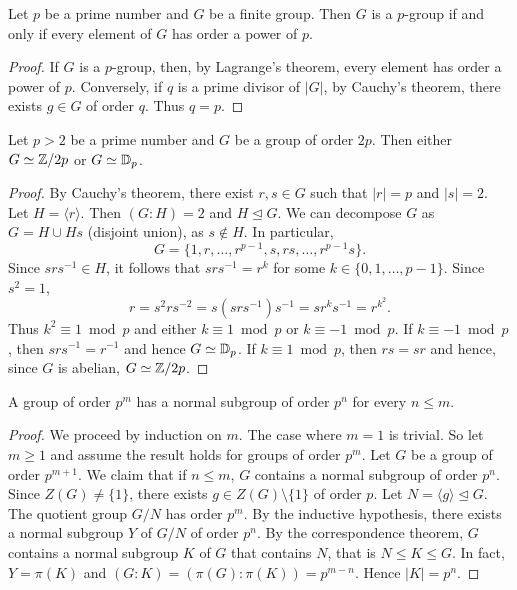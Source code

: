 \begin{corollary}
    Let $p$ be a prime number and $G$ be a finite group. 
    Then $G$ is a $p$-group if and only if 
    every element of $G$ has order a power of $p$. 
\end{corollary}

\begin{proof}
    If $G$ is a $p$-group, then, by Lagrange's theorem, 
    every element has order a power of $p$. Conversely, 
    if $q$ is a prime divisor of $|G|$, by 
    Cauchy's theorem, there exists $g\in G$ of order $q$. Thus $q=p$.
\end{proof}

\begin{corollary}
    Let $p>2$ be a prime number 
    and $G$ be a group of order $2p$. 
    Then either $G\simeq\mathbb{Z}/2p$ or $G\simeq\mathbb{D}_p$.
\end{corollary}

\begin{proof}
    By Cauchy's theorem, there exist $r,s\in G$ such that
    $|r|=p$ and $|s|=2$. Let $H=\langle r\rangle$. Then
    $(G:H)=2$ and $H\unlhd G$. We can decompose $G$ as 
    $G=H\cup Hs$ (disjoint union), 
    as $s\not\in H$. In particular, 
\[
G=\{1,r,\dots,r^{p-1},s,rs,\dots,r^{p-1}s\}.
\]
Since $srs^{-1}\in H$, it follows that $srs^{-1}=r^k$ for some
$k\in\{0,1,\dots,p-1\}$. Since $s^2=1$,
\[
r=s^2rs^{-2}=s(srs^{-1})s^{-1}=sr^ks^{-1}=r^{k^2}.
\]
Thus $k^2\equiv 1\bmod p$ and either 
$k\equiv 1\bmod p$ or $k\equiv-1\bmod p$. 
If $k\equiv -1\bmod p$, then $srs^{-1}=r^{-1}$ and hence $G\simeq\mathbb{D}_p$.
If $k\equiv 1\bmod p$, then $rs=sr$ and hence, since $G$ is abelian, $G\simeq\mathbb{Z}/{2p}$.
\end{proof}

\begin{theorem}
    A group of order $p^m$ has a normal subgroup of order
    $p^n$ for every $n\leq m$.
\end{theorem}

\begin{proof}
    We proceed by induction on $m$. The case where $m=1$ is trivial. So let $m\geq1$ and 
    assume the result holds for groups of order $p^m$. Let
    $G$ be a group of order $p^{m+1}$.
    We claim that if $n\leq m$, $G$ contains a normal subgroup of
    order $p^n$. Since $Z(G)\ne\{1\}$, there exists
    $g\in Z(G)\setminus\{1\}$ of order $p$. Let
$N=\langle g\rangle\unlhd G$. The quotient 
group $G/N$ has order $p^m$. By the inductive hypothesis, 
there exists a normal subgroup $Y$ of $G/N$ of order $p^n$. By the correspondence theorem, $G$ contains a normal subgroup $K$ of $G$ 
that contains $N$, that is $N\leq K\leq G$. In fact, 
$Y=\pi(K)$ and 
$(G:K)=(\pi(G):\pi(K))=p^{m-n}$. Hence $|K|=p^n$.
\end{proof}


